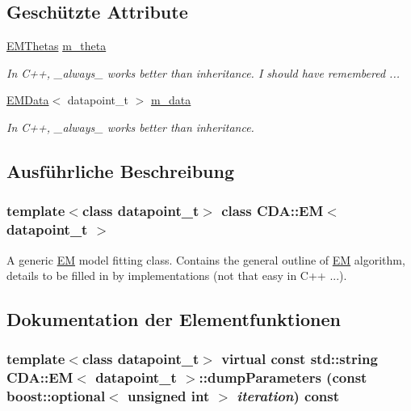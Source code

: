 \subsection*{Geschützte Attribute}
\begin{DoxyCompactItemize}
\item 
\hypertarget{classCDA_1_1EM_ad1b13cd77ab036d88042a38056bdbc2b}{
\hyperlink{classCDA_1_1EMThetas}{EMThetas} \hyperlink{classCDA_1_1EM_ad1b13cd77ab036d88042a38056bdbc2b}{m\_\-theta}}
\label{classCDA_1_1EM_ad1b13cd77ab036d88042a38056bdbc2b}

\begin{DoxyCompactList}\small\item\em In C++, \_\-always\_\- works better than inheritance. I should have remembered ... \item\end{DoxyCompactList}\item 
\hypertarget{classCDA_1_1EM_a3b79ed53bf886cd90128883e1b7132c4}{
\hyperlink{classCDA_1_1EMData}{EMData}$<$ datapoint\_\-t $>$ \hyperlink{classCDA_1_1EM_a3b79ed53bf886cd90128883e1b7132c4}{m\_\-data}}
\label{classCDA_1_1EM_a3b79ed53bf886cd90128883e1b7132c4}

\begin{DoxyCompactList}\small\item\em In C++, \_\-always\_\- works better than inheritance. \item\end{DoxyCompactList}\end{DoxyCompactItemize}


\subsection{Ausführliche Beschreibung}
\subsubsection*{template$<$class datapoint\_\-t$>$ class CDA::EM$<$ datapoint\_\-t $>$}

A generic \hyperlink{classCDA_1_1EM}{EM} model fitting class. Contains the general outline of \hyperlink{classCDA_1_1EM}{EM} algorithm, details to be filled in by implementations (not that easy in C++ ...). 

\subsection{Dokumentation der Elementfunktionen}
\hypertarget{classCDA_1_1EM_ad2655bd878821e73ba18beff576a2b4a}{
\subsubsection[{dumpParameters}]{\setlength{\rightskip}{0pt plus 5cm}template$<$class datapoint\_\-t$>$ virtual const std::string {\bf CDA::EM}$<$ datapoint\_\-t $>$::dumpParameters (const boost::optional$<$ unsigned int $>$ {\em iteration}) const}}
\label{classCDA_1_1EM_ad2655bd878821e73ba18beff576a2b4a}


